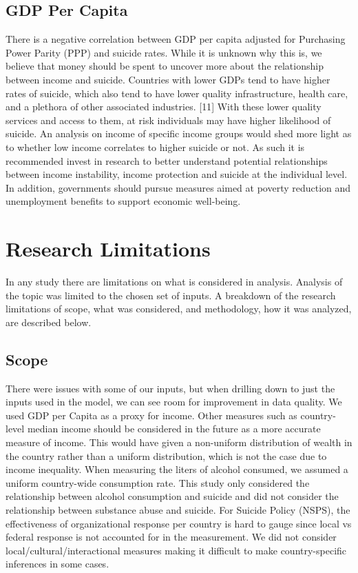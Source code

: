 \documentclass[]{article}
\begin{document}
\subsection{GDP Per Capita}\label{gdp-per-capita}

There is a negative correlation between GDP per capita adjusted for
Purchasing Power Parity (PPP) and suicide rates. While it is unknown why
this is, we believe that money should be spent to uncover more about the
relationship between income and suicide. Countries with lower GDPs tend
to have higher rates of suicide, which also tend to have lower quality
infrastructure, health care, and a plethora of other associated
industries. {[}11{]} With these lower quality services and access to
them, at risk individuals may have higher likelihood of suicide. An
analysis on income of specific income groups would shed more light as to
whether low income correlates to higher suicide or not. As such it is
recommended invest in research to better understand potential
relationships between income instability, income protection and suicide
at the individual level. In addition, governments should pursue measures
aimed at poverty reduction and unemployment benefits to support economic
well-being.

\section{Research Limitations}\label{research-limitations}

In any study there are limitations on what is considered in analysis.
Analysis of the topic was limited to the chosen set of inputs. A
breakdown of the research limitations of scope, what was considered, and
methodology, how it was analyzed, are described below.

\subsection{Scope}\label{scope}

There were issues with some of our inputs, but when drilling down to
just the inputs used in the model, we can see room for improvement in
data quality. We used GDP per Capita as a proxy for income. Other
measures such as country-level median income should be considered in the
future as a more accurate measure of income. This would have given a
non-uniform distribution of wealth in the country rather than a uniform
distribution, which is not the case due to income inequality. When
measuring the liters of alcohol consumed, we assumed a uniform
country-wide consumption rate. This study only considered the
relationship between alcohol consumption and suicide and did not
consider the relationship between substance abuse and suicide. For
Suicide Policy (NSPS), the effectiveness of organizational response per
country is hard to gauge since local vs federal response is not
accounted for in the measurement. We did not consider
local/cultural/interactional measures making it difficult to make
country-specific inferences in some cases.
\end{document}
